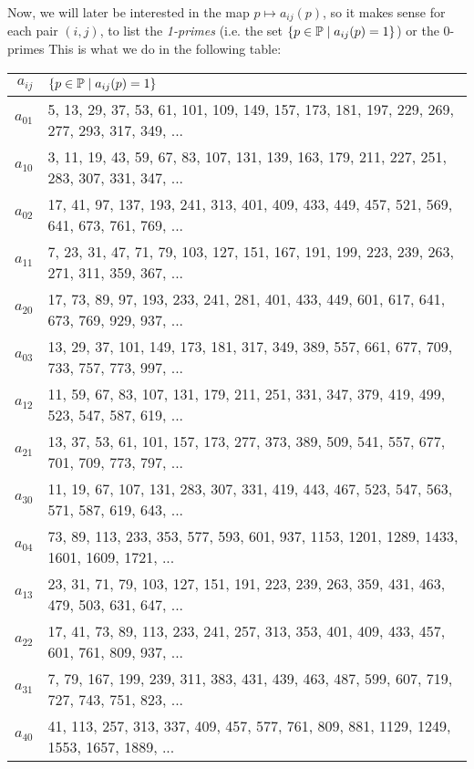 Now, we will later be interested in the map $p \mapsto a_{ij}(p)$, so it makes sense for each pair $(i,j)$, to list the \textit{1-primes} (i.e. the set $\{ p \in \mathbb{P} \mid a_{ij}(p) = 1 \}$) or the 0-primes 
This is what we do in the following table:
\begin{center}
	\begin{tabular}{|r|l|}
		\hline
		\textbf{$a_{ij}$} & \textbf{$ \lbrace p \in \mathbb{P} \mid a_{ij}(p) = 1 \rbrace $} \\
		\hline
		$ a_{0 1} $ & 5, 13, 29, 37, 53, 61, 101, 109, 149, 157, 173, 181, 197, 229, 269, 277, 293, 317, 349, ...\\
		$ a_{1 0} $ & 3, 11, 19, 43, 59, 67, 83, 107, 131, 139, 163, 179, 211, 227, 251, 283, 307, 331, 347, ...\\    
		$ a_{0 2} $ & 17, 41, 97, 137, 193, 241, 313, 401, 409, 433, 449, 457, 521, 569, 641, 673, 761, 769, ...\\
		$ a_{1 1} $ & 7, 23, 31, 47, 71, 79, 103, 127, 151, 167, 191, 199, 223, 239, 263, 271, 311, 359, 367, ...\\
		$ a_{2 0} $ & 17, 73, 89, 97, 193, 233, 241, 281, 401, 433, 449, 601, 617, 641, 673, 769, 929, 937, ...\\
		$ a_{0 3} $ & 13, 29, 37, 101, 149, 173, 181, 317, 349, 389, 557, 661, 677, 709, 733, 757, 773, 997, ...\\
		$ a_{1 2} $ & 11, 59, 67, 83, 107, 131, 179, 211, 251, 331, 347, 379, 419, 499, 523, 547, 587, 619, ...\\
		$ a_{2 1} $ & 13, 37, 53, 61, 101, 157, 173, 277, 373, 389, 509, 541, 557, 677, 701, 709, 773, 797, ...\\
		$ a_{3 0} $ & 11, 19, 67, 107, 131, 283, 307, 331, 419, 443, 467, 523, 547, 563, 571, 587, 619, 643, ...\\
		$ a_{0 4} $ & 73, 89, 113, 233, 353, 577, 593, 601, 937, 1153, 1201, 1289, 1433, 1601, 1609, 1721, ...\\
		$ a_{1 3} $ & 23, 31, 71, 79, 103, 127, 151, 191, 223, 239, 263, 359, 431, 463, 479, 503, 631, 647, ...\\
		$ a_{2 2} $ & 17, 41, 73, 89, 113, 233, 241, 257, 313, 353, 401, 409, 433, 457, 601, 761, 809, 937, ...\\
		$ a_{3 1} $ & 7, 79, 167, 199, 239, 311, 383, 431, 439, 463, 487, 599, 607, 719, 727, 743, 751, 823, ...\\
		$ a_{4 0} $ & 41, 113, 257, 313, 337, 409, 457, 577, 761, 809, 881, 1129, 1249, 1553, 1657, 1889, ...\\

\end{tabular}
\end{center}
